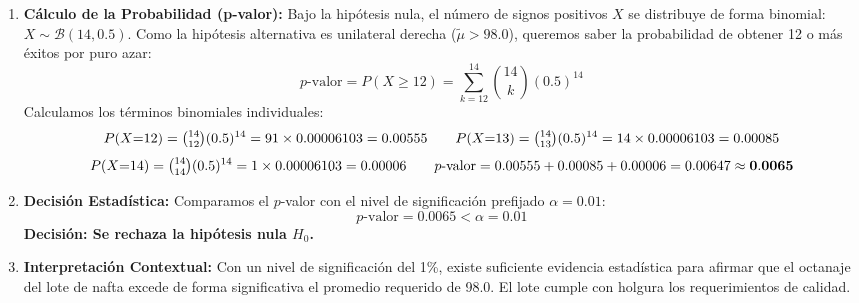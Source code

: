 \documentclass[10pt,a4paper]{article}
\begin{document}
\begin{enumerate}[leftmargin=18pt,itemsep=2pt,topsep=2pt,parsep=0pt]
  \item \textbf{Cálculo de la Probabilidad (p-valor):} Bajo la hipótesis nula, el número de signos positivos $X$ se distribuye de forma binomial: $X \sim \mathcal{B}(14, 0.5)$. Como la hipótesis alternativa es unilateral derecha ($\tilde{\mu} > 98.0$), queremos saber la probabilidad de obtener 12 o más éxitos por puro azar:
  \[
  p\text{-valor} = P(X \geq 12) = \sum_{k=12}^{14} \binom{14}{k} (0.5)^{14}
  \]
  Calculamos los términos binomiales individuales:
  \[
  P(X{=}12) = \tbinom{14}{12}(0.5)^{14} = 91 \times 0.00006103 = 0.00555
  \qquad
  P(X{=}13) = \tbinom{14}{13}(0.5)^{14} = 14 \times 0.00006103 = 0.00085
  \]
  \[
  P(X{=}14) = \tbinom{14}{14}(0.5)^{14} = 1 \times 0.00006103 = 0.00006
  \qquad
  p\text{-valor} = 0.00555 + 0.00085 + 0.00006 = 0.00647 \approx \mathbf{0.0065}
  \]

  \item \textbf{Decisión Estadística:} Comparamos el $p$-valor con el nivel de significación prefijado $\alpha = 0.01$:
  \[
  p\text{-valor} = 0.0065 < \alpha = 0.01
  \]
  \textbf{Decisión: Se rechaza la hipótesis nula $H_0$.}

  \item \textbf{Interpretación Contextual:} Con un nivel de significación del 1\%, existe suficiente evidencia estadística para afirmar que el octanaje del lote de nafta excede de forma significativa el promedio requerido de 98.0. El lote cumple con holgura los requerimientos de calidad.
\end{enumerate}

\begin{center}
\vspace{-4pt}
\vspace{-10pt}
\end{center}
\end{document}
